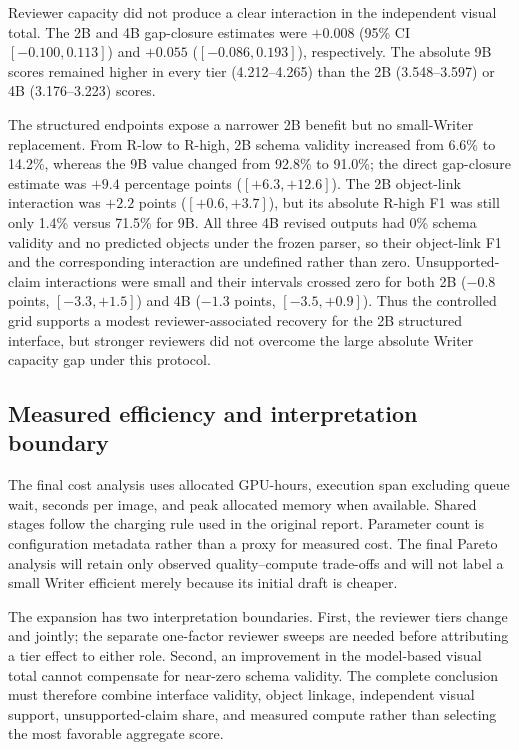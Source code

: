 Reviewer capacity did not produce a clear interaction in the independent
visual total. The 2B and 4B gap-closure estimates were $+0.008$ (95\% CI
$[-0.100,0.113]$) and $+0.055$ ($[-0.086,0.193]$), respectively. The absolute
9B scores remained higher in every tier (4.212--4.265) than the 2B
(3.548--3.597) or 4B (3.176--3.223) scores.

The structured endpoints expose a narrower 2B benefit but no small-Writer
replacement. From R-low to R-high, 2B schema validity increased from 6.6\% to
14.2\%, whereas the 9B value changed from 92.8\% to 91.0\%; the direct
gap-closure estimate was $+9.4$ percentage points ($[+6.3,+12.6]$). The 2B
object-link interaction was $+2.2$ points ($[+0.6,+3.7]$), but its absolute
R-high F1 was still only 1.4\% versus 71.5\% for 9B. All three 4B revised
outputs had 0\% schema validity and no predicted objects under the frozen
parser, so their object-link F1 and the corresponding interaction are
undefined rather than zero. Unsupported-claim interactions were small and
their intervals crossed zero for both 2B ($-0.8$ points,
$[-3.3,+1.5]$) and 4B ($-1.3$ points, $[-3.5,+0.9]$). Thus the controlled
grid supports a modest reviewer-associated recovery for the 2B structured
interface, but stronger reviewers did not overcome the large absolute Writer
capacity gap under this protocol.

\subsection{Measured efficiency and interpretation boundary}

The final cost analysis uses allocated GPU-hours, execution span excluding
queue wait, seconds per image, and peak allocated memory when available. Shared
stages follow the charging rule used in the original report. Parameter count
is configuration metadata rather than a proxy for measured cost. The final
Pareto analysis will retain only observed quality--compute trade-offs and will
not label a small Writer efficient merely because its initial draft is cheaper.

The expansion has two interpretation boundaries. First, the reviewer tiers
change \Rc{} and \Rd{} jointly; the separate one-factor reviewer sweeps are
needed before attributing a tier effect to either role. Second, an improvement
in the model-based visual total cannot compensate for near-zero schema validity.
The complete conclusion must therefore combine interface validity, object
linkage, independent visual support, unsupported-claim share, and measured
compute rather than selecting the most favorable aggregate score.
